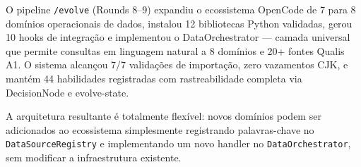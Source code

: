 \documentclass[12pt,a4paper]{article}
\begin{document}
O pipeline \texttt{/evolve} (Rounds 8–9) expandiu o ecossistema OpenCode de 7 para 8 domínios operacionais de dados, instalou 12 bibliotecas Python validadas, gerou 10 hooks de integração e implementou o DataOrchestrator — camada universal que permite consultas em linguagem natural a 8 domínios e 20+ fontes Qualis A1. O sistema alcançou 7/7 validações de importação, zero vazamentos CJK, e mantém 44 habilidades registradas com rastreabilidade completa via DecisionNode e evolve-state.

A arquitetura resultante é totalmente flexível: novos domínios podem ser adicionados ao ecossistema simplesmente registrando palavras-chave no \texttt{DataSourceRegistry} e implementando um novo handler no \texttt{DataOrchestrator}, sem modificar a infraestrutura existente.

\end{document}
